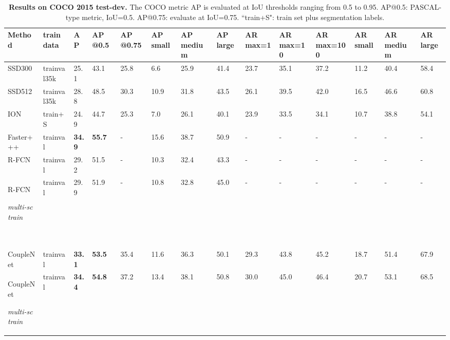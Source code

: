 \documentclass[10pt,twocolumn,letterpaper]{article}
\begin{document}
\begin{table*}[!htbp]
\begin{center}
\begin{tabularx}{\linewidth}{>{\footnotesize}p{2.75cm}|>{\footnotesize}p{1cm}<{\centering}|>{\small}p{0.45cm}<{\centering}|>{\small}p{0.55cm}<{\centering}|>{\small}p{0.7cm}<{\centering}|>{\small}p{0.65cm}<{\centering}
>{\small}p{0.95cm}<{\centering}>{\small}p{0.5cm}<{\centering}|>{\small}p{0.5cm}<{\centering}>{\small}p{0.6cm}<{\centering}>{\small}p{0.9cm}<{\centering}|>{\small}p{0.65cm}<{\centering}>{\small}p{0.95cm}<{\centering}>{\small}p{0.4cm}<{\centering}}
\hline
Method& train data&\footnotesize{AP}&\footnotesize{AP @0.5}&\footnotesize{AP @0.75}&\footnotesize{AP small}&\footnotesize{AP medium}&\footnotesize{AP large}&\footnotesize{AR max=1}&\footnotesize{AR max=10}&\footnotesize{AR max=100}&\footnotesize{AR small}&\footnotesize{AR medium}&\footnotesize{AR large} \\
\hline
SSD300~\cite{liu2016ssd} & \scriptsize{trainval35k}&25.1&43.1&25.8&6.6&25.9&41.4&23.7&35.1&37.2&11.2&40.4&58.4 \\
SSD512~\cite{liu2016ssd} & \scriptsize{trainval35k}&28.8&48.5&30.3&10.9&31.8&43.5&26.1&39.5&42.0&16.5&46.6&60.8 \\
\hline
ION~\cite{bell16ion} & \scriptsize{train+S}&24.9&44.7&25.3&7.0&26.1&40.1&23.9&33.5&34.1&10.7&38.8&54.1 \\
Faster+++~\cite{he2016deep} & \scriptsize{trainval}&\textbf{34.9} &\textbf{55.7} &- &15.6 &38.7 &50.9 &- &- &- &-  &- &- \\
R-FCN~\cite{li2016r} & \scriptsize{trainval}  &29.2 &51.5 &- &10.3 &32.4 &43.3 &- &- &- &-  &- &- \\
R-FCN \begin{scriptsize}\textit{multi-sc train}\end{scriptsize}~\cite{li2016r} & \scriptsize{trainval}  &29.9 &51.9 &- &10.8 &32.8 &45.0 &- &- &- &-  &- &- \\
\hline
CoupleNet & \scriptsize{trainval}  &\textbf{33.1} &\textbf{53.5} &35.4 &11.6 &36.3 &50.1 &29.3 &43.8 &45.2 &18.7 &51.4 &67.9 \\
CoupleNet \begin{scriptsize}\textit{multi-sc train}\end{scriptsize} & \scriptsize{trainval}  &\textbf{34.4} &\textbf{54.8} &37.2 &13.4 &38.1 &50.8 &30.0 &45.0 &46.4 &20.7  &53.1 &68.5 \\
\hline
\end{tabularx}
\end{center}
\caption{\textbf{Results on COCO 2015 test-dev.} The COCO metric AP is evaluated at IoU thresholds ranging from 0.5 to 0.95. AP@0.5: PASCAL-type metric, IoU=0.5. AP@0.75: evaluate at IoU=0.75. ``train+S": train set plus segmentation labels.}
\label{COCO}
\end{table*}
\end{document}
